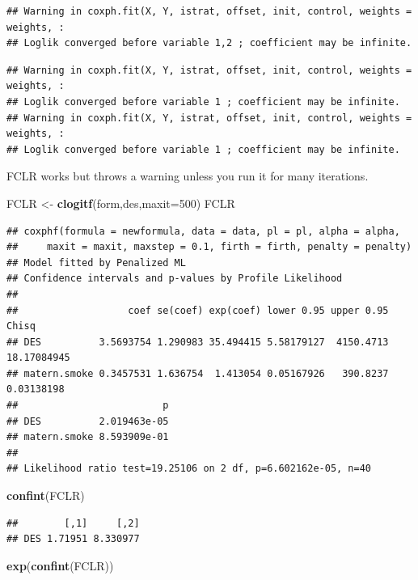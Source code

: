 \documentclass[
]{article}
\newenvironment{Shaded}{\begin{snugshade}}{\end{snugshade}}
\newcommand{\AttributeTok}[1]{\textcolor[rgb]{0.13,0.29,0.53}{#1}}
\newcommand{\DecValTok}[1]{\textcolor[rgb]{0.00,0.00,0.81}{#1}}
\newcommand{\FunctionTok}[1]{\textcolor[rgb]{0.13,0.29,0.53}{\textbf{#1}}}
\newcommand{\NormalTok}[1]{#1}
\newcommand{\OtherTok}[1]{\textcolor[rgb]{0.56,0.35,0.01}{#1}}
\begin{document}
\begin{verbatim}
## Warning in coxph.fit(X, Y, istrat, offset, init, control, weights = weights, :
## Loglik converged before variable 1,2 ; coefficient may be infinite.
\end{verbatim}

\begin{verbatim}
## Warning in coxph.fit(X, Y, istrat, offset, init, control, weights = weights, :
## Loglik converged before variable 1 ; coefficient may be infinite.
## Warning in coxph.fit(X, Y, istrat, offset, init, control, weights = weights, :
## Loglik converged before variable 1 ; coefficient may be infinite.
\end{verbatim}

FCLR works but throws a warning unless you run it for many iterations.

\begin{Shaded}
\begin{Highlighting}[]
\NormalTok{FCLR }\OtherTok{\textless{}{-}} \FunctionTok{clogitf}\NormalTok{(form,des,}\AttributeTok{maxit=}\DecValTok{500}\NormalTok{)}
\NormalTok{FCLR}
\end{Highlighting}
\end{Shaded}

\begin{verbatim}
## coxphf(formula = newformula, data = data, pl = pl, alpha = alpha, 
##     maxit = maxit, maxstep = 0.1, firth = firth, penalty = penalty)
## Model fitted by Penalized ML
## Confidence intervals and p-values by Profile Likelihood 
## 
##                   coef se(coef) exp(coef) lower 0.95 upper 0.95       Chisq
## DES          3.5693754 1.290983 35.494415 5.58179127  4150.4713 18.17084945
## matern.smoke 0.3457531 1.636754  1.413054 0.05167926   390.8237  0.03138198
##                         p
## DES          2.019463e-05
## matern.smoke 8.593909e-01
## 
## Likelihood ratio test=19.25106 on 2 df, p=6.602162e-05, n=40
\end{verbatim}

\begin{Shaded}
\begin{Highlighting}[]
\FunctionTok{confint}\NormalTok{(FCLR)}
\end{Highlighting}
\end{Shaded}

\begin{verbatim}
##        [,1]     [,2]
## DES 1.71951 8.330977
\end{verbatim}

\begin{Shaded}
\begin{Highlighting}[]
\FunctionTok{exp}\NormalTok{(}\FunctionTok{confint}\NormalTok{(FCLR))}
\end{Highlighting}
\end{Shaded}
\end{document}

